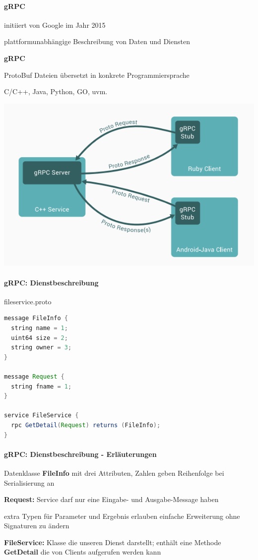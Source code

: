 \documentclass[10pt]{article}
\begin{document}
\paragraph{gRPC}

\begin{itemize*}
  \item initiiert von Google im Jahr 2015
  \item plattformunabhängige Beschreibung von Daten und Diensten
\end{itemize*}
\color{orange} \textbf{gRPC} \color{black}
\begin{itemize*}
  \item ProtoBuf Dateien übersetzt in konkrete Programmiersprache
  \item C/C++, Java, Python, GO, uvm.
\end{itemize*}
\begin{center}
  \includegraphics[width=0.45\linewidth]{Assets/Programmierparadigmen-grpc}
\end{center}

\paragraph{gRPC: Dienstbeschreibung}

fileservice.proto
\begin{lstlisting}[language=java]
message FileInfo {
  string name = 1;
  uint64 size = 2;
  string owner = 3;
}

message Request {
  string fname = 1;
}

service FileService {
  rpc GetDetail(Request) returns (FileInfo);
}
\end{lstlisting}

\paragraph{gRPC: Dienstbeschreibung - Erläuterungen}

\begin{itemize*}
  \item Datenklasse \textbf{FileInfo} mit drei Attributen, Zahlen geben Reihenfolge bei Serialisierung an
  \item \textbf{Request:} Service darf nur eine Eingabe- und Ausgabe-Message haben
  \begin{itemize*}
    \item extra Typen für Parameter und Ergebnis erlauben einfache Erweiterung ohne Signaturen zu ändern
  \end{itemize*}
  \item \textbf{FileService:} Klasse die unseren Dienst darstellt; enthält eine Methode \textbf{GetDetail} die von Clients aufgerufen werden kann
\end{itemize*}
\end{document}
